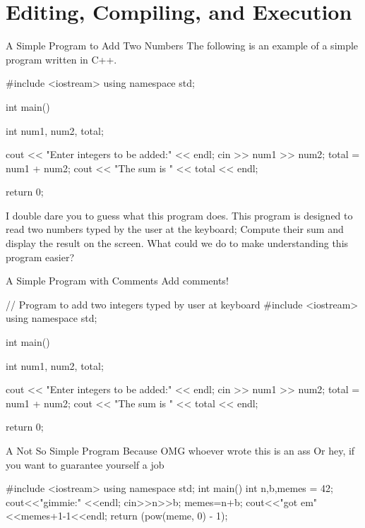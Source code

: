 \documentclass[../lecture1-introduction.tex]{subfiles}
\begin{document}
\section{Editing, Compiling, and Execution}

\begin{frame}[fragile]{A Simple Program to Add Two Numbers}
    The following is an example of a simple program written in C++.
\begin{cppcode}[]
#include <iostream>
using namespace std;

int main()
{
    int num1, num2, total;

    cout << "Enter integers to be added:" << endl;
    cin >> num1 >> num2;
    total = num1 + num2;
    cout << "The sum is " << total << endl;

    return 0;
}
\end{cppcode}
    {
        I double dare you to guess what this program does.
    }
    {
        This program is designed to read two numbers typed by the user at the
        keyboard; Compute their sum and display the result on the screen.
    }
    {
        What could we do to make understanding this program easier?
    }
\end{frame}


\begin{frame}[fragile]{A Simple Program with Comments}
    Add comments!
\begin{cppcode}[]
// Program to add two integers typed by user at keyboard
#include <iostream>
using namespace std;

int main()
{
    int num1, num2, total;

    cout << "Enter integers to be added:" << endl;
    cin >> num1 >> num2;
    total = num1 + num2;
    cout << "The sum is " << total << endl;

    return 0;
}
\end{cppcode}
\end{frame}


\begin{frame}[fragile]{A Not So Simple Program Because OMG whoever wrote this is an ass}
    Or hey, if you want to guarantee yourself a job
\begin{cppcode}[]
#include <iostream>
using namespace std;
int main(){
    int n,b,memes = 42;
cout<<"gimmie:" <<endl;
        cin>>n>>b;
    memes=n+b;
cout<<"got em" <<memes+1-1<<endl;
    return (pow(meme, 0) - 1);}
\end{cppcode}
\end{frame}
\end{document}
